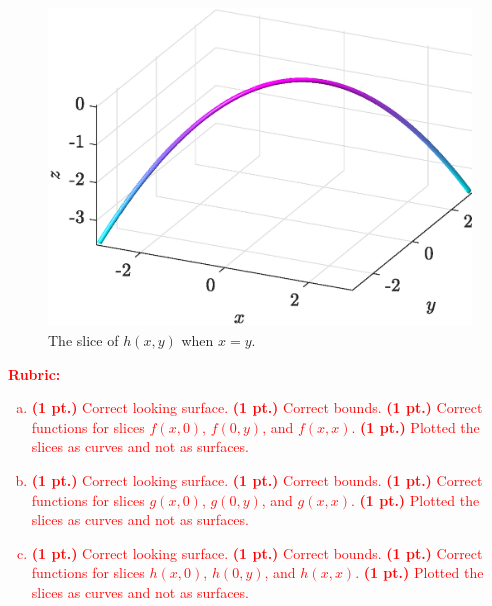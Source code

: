 \documentclass[12pt]{article} %
\begin{document}
\begin{solution}
\begin{enumerate}[(a)]
\begin{figure}[H]
        \centering
        \includegraphics[width=.8\textwidth]{figures/3c_x=y}
        \caption{The slice of $h(x,y)$ when $x=y$.}
    \end{figure}
\end{enumerate}
\end{solution}
\textcolor{red}{
\noindent \textbf{Rubric:}
\begin{enumerate}[(a)]
    \item \textbf{(1 pt.)} Correct looking surface. \textbf{(1 pt.)} Correct bounds. \textbf{(1 pt.)} Correct functions for slices $f(x,0)$, $f(0,y)$, and $f(x,x)$. \textbf{(1 pt.)} Plotted the slices as curves and not as surfaces.
    \item \textbf{(1 pt.)} Correct looking surface. \textbf{(1 pt.)} Correct bounds. \textbf{(1 pt.)} Correct functions for slices $g(x,0)$, $g(0,y)$, and $g(x,x)$. \textbf{(1 pt.)} Plotted the slices as curves and not as surfaces.
    \item \textbf{(1 pt.)} Correct looking surface. \textbf{(1 pt.)} Correct bounds. \textbf{(1 pt.)} Correct functions for slices $h(x,0)$, $h(0,y)$, and $h(x,x)$. \textbf{(1 pt.)} Plotted the slices as curves and not as surfaces.
\end{enumerate}
}
\end{document}
